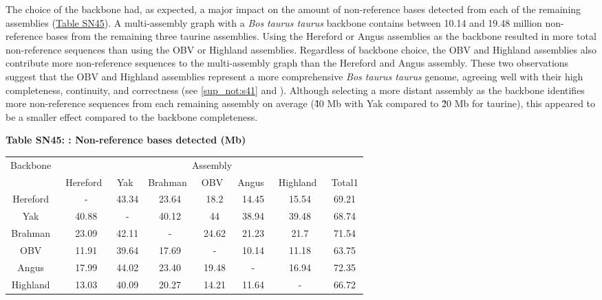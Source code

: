 \documentclass[../main.tex]{subfiles}
\begin{document}
\begin{flushleft}
The choice of the backbone had, as expected, a major impact on the amount of non-reference bases detected from each of the remaining assemblies (\hyperlink{Table SN45}{Table SN45}). A multi-assembly graph with a \emph{Bos taurus taurus} backbone contains between 10.14 and 19.48 million non-reference bases from the remaining three taurine assemblies. Using the Hereford or Angus assemblies as the backbone resulted in more total non-reference sequences than using the OBV or Highland assemblies. Regardless of backbone choice, the OBV and Highland assemblies also contribute more non-reference sequences to the multi-assembly graph than the Hereford and Angus assembly. These two observations suggest that the OBV and Highland assemblies represent a more comprehensive \emph{Bos taurus taurus} genome, agreeing well with their high completeness, continuity, and correctness (see \ref{sup_not:s41} and \citep{rice2020continuous}). Although selecting a more distant assembly as the backbone identifies more non-reference sequences from each remaining assembly on average (\~40 Mb with Yak compared to \~20 Mb for taurine), this appeared to be a smaller effect compared to the backbone completeness.

\bigskip

\textbf{\hypertarget{Table SN45}{Table SN45}: : Non-reference bases detected (Mb)}
\begin{center}
    \begin{tabular}{|c|c|c|c|c|c|c|c|}
    \hline
    \multirow{2}{*}{Backbone~} & \multicolumn{7}{c|}{Assembly}                                       \\
    \cline{2-8}
                               & Hereford~ & Yak~  & Brahman~ & OBV~  & Angus~ & Highland~ & Total1  \\
    \hline
    Hereford~                  & -         & 43.34 & 23.64    & 18.2  & 14.45  & 15.54     & 69.21   \\
    \hline
    Yak~                       & 40.88     & -     & 40.12    & 44    & 38.94  & 39.48     & 68.74   \\
    \hline
    Brahman~                   & 23.09     & 42.11 & -        & 24.62 & 21.23  & 21.7      & 71.54   \\
    \hline
    OBV~                       & 11.91     & 39.64 & 17.69    & -     & 10.14  & 11.18     & 63.75   \\
    \hline
    Angus~                     & 17.99     & 44.02 & 23.40    & 19.48 & -      & 16.94     & 72.35   \\
    \hline
    Highland~                  & 13.03     & 40.09 & 20.27    & 14.21 & 11.64  & -         & 66.72   \\
    \hline
    \end{tabular}
\end{center}


\end{flushleft}
\end{document}
